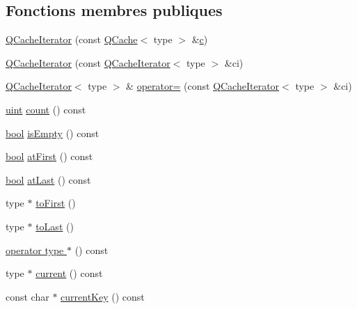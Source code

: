 \subsection*{Fonctions membres publiques}
\begin{DoxyCompactItemize}
\item 
\hyperlink{class_q_cache_iterator_a8ce66f9d4184d0013ea7a59674080d67}{Q\+Cache\+Iterator} (const \hyperlink{class_q_cache}{Q\+Cache}$<$ type $>$ \&\hyperlink{060__command__switch_8tcl_ab14f56bc3bd7680490ece4ad7815465f}{c})
\item 
\hyperlink{class_q_cache_iterator_aa94183546e51c5e0a844258e3059528e}{Q\+Cache\+Iterator} (const \hyperlink{class_q_cache_iterator}{Q\+Cache\+Iterator}$<$ type $>$ \&ci)
\item 
\hyperlink{class_q_cache_iterator}{Q\+Cache\+Iterator}$<$ type $>$ \& \hyperlink{class_q_cache_iterator_abfb5a979564b4e1e5bdc63f960d40774}{operator=} (const \hyperlink{class_q_cache_iterator}{Q\+Cache\+Iterator}$<$ type $>$ \&ci)
\item 
\hyperlink{qglobal_8h_a4d3943ddea65db7163a58e6c7e8df95a}{uint} \hyperlink{class_q_cache_iterator_a2a5e7feec4f6baba6573253efdc18dd5}{count} () const 
\item 
\hyperlink{qglobal_8h_a1062901a7428fdd9c7f180f5e01ea056}{bool} \hyperlink{class_q_cache_iterator_ac960dcf46746f1db0f5ee915ad030bef}{is\+Empty} () const 
\item 
\hyperlink{qglobal_8h_a1062901a7428fdd9c7f180f5e01ea056}{bool} \hyperlink{class_q_cache_iterator_a719eaf0a9140aa34c13fa451ede7052d}{at\+First} () const 
\item 
\hyperlink{qglobal_8h_a1062901a7428fdd9c7f180f5e01ea056}{bool} \hyperlink{class_q_cache_iterator_a119579515698d07e49055b512d6e93d7}{at\+Last} () const 
\item 
type $\ast$ \hyperlink{class_q_cache_iterator_acae7f57008d32c333d9d0ea6e5630434}{to\+First} ()
\item 
type $\ast$ \hyperlink{class_q_cache_iterator_aa6c84065b43a3c73fbaeb9ae98016156}{to\+Last} ()
\item 
\hyperlink{class_q_cache_iterator_a310b35114298848ebf94db57d41f65ec}{operator type $\ast$} () const 
\item 
type $\ast$ \hyperlink{class_q_cache_iterator_ac4b9a6fef09e4a88bed45ce1146430e3}{current} () const 
\item 
const char $\ast$ \hyperlink{class_q_cache_iterator_a44b4fefca32b5566a6845d5945e7d697}{current\+Key} () const 
\item 

\end{DoxyCompactItemize}
